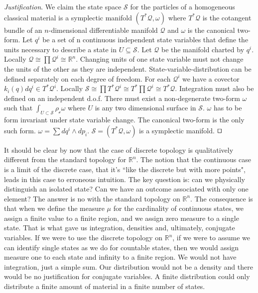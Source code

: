 \documentclass[smallextended]{svjour3}
\numberwithin{equation}{section}
\newenvironment{justification}{\emph{Justification}.}{\hfill\(\qed\)}
\begin{document}
\begin{justification}
	We claim the state space $\mathcal{S}$ for the particles of a homogeneous classical material is a symplectic manifold $(T^*\mathcal{Q}, \omega)$ where $T^*\mathcal{Q}$ is the cotangent bundle of an $n$-dimensional differentiable manifold $\mathcal{Q}$ and $\omega$ is the canonical two-form. Let $q^i$ be a set of n continuous independent state variables that define the units necessary to describe a state in $U \subseteq \mathcal{S}$. Let $\mathcal{Q}$ be the manifold charted by $q^i$. Locally $\mathcal{Q} \cong \prod \mathcal{Q}^i \cong \mathbb{R}^n$. Changing units of one state variable must not change the units of the other as they are independent. State-variable-distribution can  be defined separately on each degree of freedom. For each $\mathcal{Q}^i$ we have a covector $k_i(q) dq^i \in T^*\mathcal{Q}^i$. Locally $\mathcal{S} \cong \prod T^*\mathcal{Q}^i \cong T^* \prod \mathcal{Q}^i \cong T^* \mathcal{Q}$. Integration must also be defined on an independent d.o.f. There must exist a non-degenerate two-form $\omega$ such that $\int_{U \subset \mathcal{S}} \rho_\mathcal{c} \omega$ where $U$ is any two dimensional surface in $\mathcal{S}$. $\omega$ has to be form invariant under state variable change. The canonical two-form is the only such form. $\omega = \sum dq^i \wedge dp_i$. $\mathcal{S} = (T^*\mathcal{Q}, \omega)$ is a symplectic manifold.
\end{justification}

It should be clear by now that the case of discrete topology is qualitatively different from the standard topology for $\mathbb{R}^n$. The notion that the continuous case is a limit of the discrete case, that it's ``like the discrete but with more points", leads in this case to erroneous intuition. The key question is: can we physically distinguish an isolated state? Can we have an outcome associated with only one element? The answer is no with the standard topology on $\mathbb{R}^n$. The consequence is that when we define the measure $\mu$ for the cardinality of continuous states, we assign a finite value to a finite region, and we assign zero measure to a single state. That is what gave us integration, densities and, ultimately, conjugate variables. If we were to use the discrete topology on $\mathbb{R}^n$, if we were to assume we can identify single states as we do for countable states, then we would assign measure one to each state and infinity to a finite region. We would not have integration, just a simple sum. Our distribution would not be a density and there would be no justification for conjugate variables. A finite distribution could only distribute a finite amount of material in a finite number of states.
\end{document}
